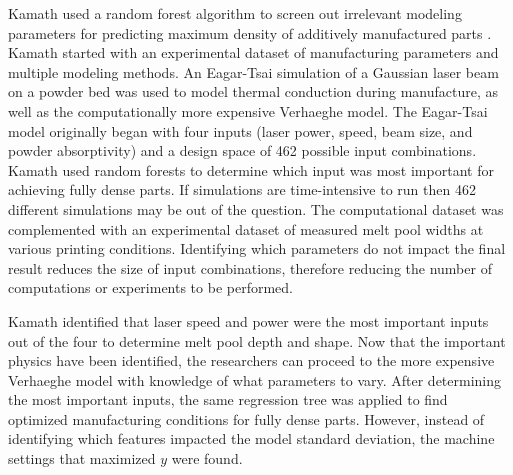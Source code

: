 Kamath used a random forest algorithm to screen out irrelevant modeling parameters for predicting maximum density of additively manufactured parts \cite{Kamath2016}. Kamath started with an experimental dataset of manufacturing parameters and multiple modeling methods. An Eagar-Tsai simulation of a Gaussian laser beam on a powder bed was used to model thermal conduction during manufacture, as well as the computationally more expensive Verhaeghe model. The Eagar-Tsai model originally began with four inputs (laser power, speed, beam size, and powder absorptivity) and a design space of 462 possible input combinations. Kamath used random forests to determine which input was most important for achieving fully dense parts. If simulations are time-intensive to run then 462 different simulations may be out of the question. The computational dataset was complemented with an experimental dataset of measured melt pool widths at various printing conditions. Identifying which parameters do not impact the final result reduces the size of input combinations, therefore reducing the number of computations or experiments to be performed. 

Kamath identified that laser speed and power were the most important inputs out of the four to determine melt pool depth and shape. Now that the important physics have been identified, the researchers can proceed to the more expensive Verhaeghe model with knowledge of what parameters to vary.  After determining the most important inputs, the same regression tree was applied to find optimized manufacturing conditions for fully dense parts. However, instead of identifying which features impacted the model standard deviation, the machine settings that maximized $y$ were found. 

